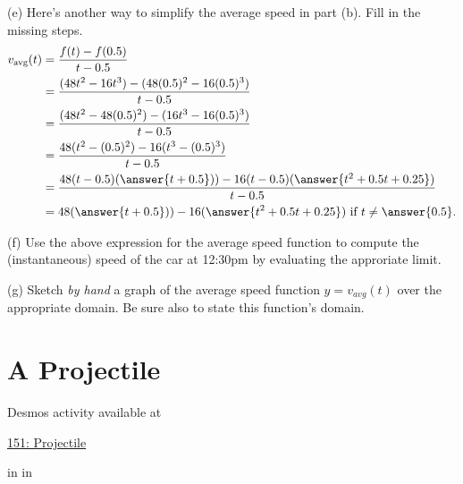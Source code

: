 \documentclass{ximera}
\newcommand{\pskip}{\vskip 0.1 in}
\begin{document}
\begin{example}
\begin{question}
(e) Here's another way to simplify the average speed in part (b). Fill in the missing steps.
\begin{align*}
   v_{\text{avg}}(t) &= \frac{f(t) - f(0.5)}{t - 0.5} \\
                        &= \frac{(48t^2 - 16t^3) - (48(0.5)^2 -16(0.5)^3)}{t-0.5} \\
                        &= \frac{(48t^2 - 48(0.5)^2) - (16t^3 -16(0.5)^3) }{t-0.5} \\
                        &= \frac{48(t^2 - (0.5)^2) - 16(t^3 -(0.5)^3) }{t-0.5} \\
                       &= \frac{48(t-0.5)(\answer{t+0.5})) - 16(t-0.5)(\answer{t^2 + 0.5 t + 0.25}) }{t-0.5} \\
                       &=  48(\answer{t+0.5})) - 16(\answer{t^2 + 0.5 t + 0.25})  \text{ if } t\neq \answer{0.5}.
\end{align*}

(f) Use the above expression for the average speed function to compute the (instantaneous) speed of the car at 12:30pm by evaluating the approriate limit.

(g) Sketch \emph{by hand} a graph of the average speed function $y=v_{avg}(t)$ over the appropriate domain. Be sure also to state this function's domain. 

\end{question}
\end{example}


\section{A Projectile}

\begin{example}   \label{Ex4erxde}


 
\begin{onlineOnly}
    \begin{center}
\end{center}
\end{onlineOnly}

Desmos activity available at

\href{https://www.desmos.com/calculator/u5z5j43wyz}{151: Projectile}

\pskip \pskip


\end{example}
\end{document}
